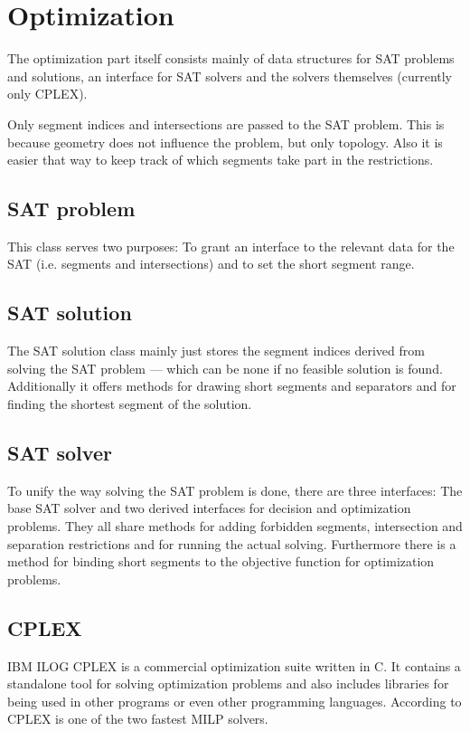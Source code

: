 \section{Optimization}
The optimization part itself consists mainly of data structures for
SAT problems and solutions, an interface for SAT solvers and the
solvers themselves (currently only CPLEX).

Only segment indices and intersections are passed to the SAT problem.
This is because geometry does not influence the problem, but only
topology. Also it is easier that way to keep track of which segments
take part in the restrictions.

\subsection{SAT problem}
This class serves two purposes: To grant an interface to the relevant
data for the SAT (i.e. segments and intersections) and to set the
short segment range.

\subsection{SAT solution}
The SAT solution class mainly just stores the segment indices derived
from solving the SAT problem --- which can be none if no feasible
solution is found. Additionally it offers methods for drawing short
segments and separators and for finding the shortest segment of the
solution.

\subsection{SAT solver}
To unify the way solving the SAT problem is done, there are three
interfaces: The base SAT solver and two derived interfaces for
decision and optimization problems. They all share methods for adding
forbidden segments, intersection and separation restrictions and for
running the actual solving. Furthermore there is a method for binding
short segments to the objective function for optimization problems.

\subsection{CPLEX}
IBM ILOG CPLEX \cite{cplex}
is a commercial optimization suite written in C. It contains a
standalone tool for solving optimization problems and also includes
libraries for being used in other programs or even other programming
languages. According to \cite{cplex_benchmark}
CPLEX is one of the two fastest MILP solvers.

